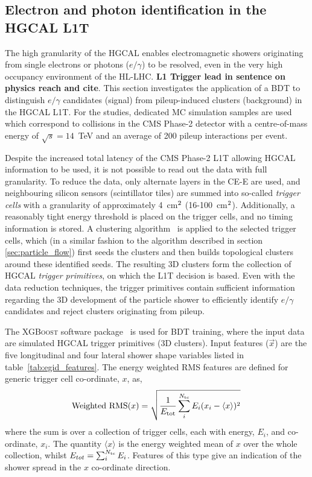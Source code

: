 \subsection{Electron and photon identification in the HGCAL L1T}
The high granularity of the HGCAL enables electromagnetic showers originating from single electrons or photons ($e/\gamma$) to be resolved, even in the very high occupancy environment of the HL-LHC. \textbf{L1 Trigger lead in sentence on physics reach and cite}. This section investigates the application of a BDT to distinguish $e/\gamma$ candidates (signal) from pileup-induced clusters (background) in the HGCAL L1T. For the studies, dedicated MC simulation samples are used which correspond to collisions in the CMS Phase-2 detector with a centre-of-mass energy of $\sqrt{s}=14$~TeV and an average of 200 pileup interactions per event.

Despite the increased total latency of the CMS Phase-2 L1T allowing HGCAL information to be used, it is not possible to read out the data with full granularity. To reduce the data, only alternate layers in the CE-E are used, and neighbouring silicon sensors (scintillator tiles) are summed into so-called \textit{trigger cells} with a granularity of approximately 4~cm$^{\rm{2}}$ (16-100~cm$^{\rm{2}}$). Additionally, a reasonably tight energy threshold is placed on the trigger cells, and no timing information is stored. A clustering algorithm~\cite{} is applied to the selected trigger cells, which (in a similar fashion to the algorithm described in section \ref{sec:particle_flow}) first seeds the clusters and then builds topological clusters around these identified seeds. The resulting 3D clusters form the collection of HGCAL \textit{trigger primitives}, on which the L1T decision is based. Even with the data reduction techniques, the trigger primitives contain sufficient information regarding the 3D development of the particle shower to efficiently identify $e/\gamma$ candidates and reject clusters originating from pileup.

The \textsc{XGBoost} software package~\cite{} is used for BDT training, where the input data are simulated HGCAL trigger primitives (3D clusters). Input features ($\vec{x}$) are the five longitudinal and four lateral shower shape variables listed in table~\ref{tab:egid_features}. The energy weighted RMS features are defined for generic trigger cell co-ordinate, $x$, as,
\begin{equation}
    {\rm{Weighted}\,\,\rm{RMS}}(x) = \sqrt{\frac{1}{E_{\rm{tot}}}\sum^{N_{\rm{tc}}}_{i} E_i (x_i-\langle x \rangle)^2}\,
\end{equation}
\noindent
where the sum is over a collection of trigger cells, each with energy, $E_i$, and co-ordinate, $x_i$. The quantity $\langle x \rangle$ is the energy weighted mean of $x$ over the whole collection, whilst $E_{tot}=\sum^{N_{\rm{tc}}}_iE_i$. Features of this type give an indication of the shower spread in the $x$ co-ordinate direction.

